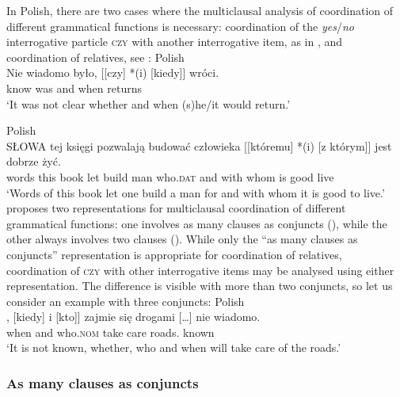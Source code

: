 \documentclass[output=paper]{../langscibook}
\begin{document}
In Polish, there are two cases where the multiclausal analysis of
coordination of different grammatical functions is necessary:
coordination of the \emph{yes}/\emph{no} interrogative particle
\textsc{czy} with another interrogative item, as in
, and coordination of relatives, see
:
\ea\label{ex:Patejuk2015:5.160}
    Polish\\\gll
      Nie wiadomo było, [[czy] *(i) [kiedy]] wróci. \\
      \NEG{} know was \phtm{[[} \phtm{*(}and \phtm{[}when returns\\
\glt`It was not clear whether and when (s)he/it would return.'\nkjp
%
  \item\label{ex:Patejuk2015:5.276}
  Polish\\\gll
    SŁOWA tej księgi pozwalają budować człowieka [[któremu] *(i) [z którym]] jest dobrze żyć. \\
    words this book let build man \phtm{[[}who.\textsc{dat} \phtm{*(}and \phtm{[}with whom is good live\\
 \glt`Words of this book let one build a man for and with whom it is good to live.' \hspace*{\fill}\nkjp
\z
\citet{Patejuk2015} proposes two representations for
multiclausal coordination of different grammatical functions: one
involves as many clauses as conjuncts (), while the other always involves
two clauses (). While only the ``as many clauses as conjuncts'' representation
is appropriate for coordination of relatives, coordination of
\textsc{czy} with other interrogative items may be analysed using either
representation. The difference is visible with more than two conjuncts,
so let us consider an example with three conjuncts:
\ea\label{ex:Patejuk2015:5.237}
    Polish\\\gll
      [[Czy], [kiedy] i [kto]] {zajmie się} drogami […] nie wiadomo. \\
      \phtm{[[} \phtm{[}when and \phtm{[}who.\textsc{nom} {take care} roads.{\INS} {}
      \NEG{} known\\
\glt`It is not known, whether, who and when will take care of
    the roads.'\\\hspace*{\fill}\nkjp
\z

\subsubsection{As many clauses as conjuncts}
\label{sec:Coordination:lexsem:multi:multicl}
\end{document}
